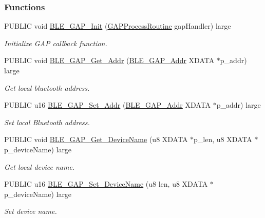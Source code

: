 \subsubsection*{Functions}
\begin{DoxyCompactItemize}
\item 
P\+U\+B\+L\+IC void \hyperlink{group___b_l_e___g_a_p_gac45863c4eb8ff1d4018f46a4bd6f8d90}{B\+L\+E\+\_\+\+G\+A\+P\+\_\+\+Init} (\hyperlink{group___b_l_e___g_a_p_ga239e1eed98ed57692459e70cad9d7021}{G\+A\+P\+Process\+Routine} gap\+Handler) large
\begin{DoxyCompactList}\small\item\em Initialize G\+AP callback function. \end{DoxyCompactList}\item 
P\+U\+B\+L\+IC void \hyperlink{group___b_l_e___g_a_p_ga9cee45941e9fbce9f1767c3de10658b7}{B\+L\+E\+\_\+\+G\+A\+P\+\_\+\+Get\+\_\+\+Addr} (\hyperlink{struct_b_l_e___g_a_p___addr}{B\+L\+E\+\_\+\+G\+A\+P\+\_\+\+Addr} X\+D\+A\+TA $\ast$p\+\_\+addr) large
\begin{DoxyCompactList}\small\item\em Get local bluetooth address. \end{DoxyCompactList}\item 
P\+U\+B\+L\+IC u16 \hyperlink{group___b_l_e___g_a_p_ga2c2ea40af263988eeb5d7ef561eae18f}{B\+L\+E\+\_\+\+G\+A\+P\+\_\+\+Set\+\_\+\+Addr} (\hyperlink{struct_b_l_e___g_a_p___addr}{B\+L\+E\+\_\+\+G\+A\+P\+\_\+\+Addr} X\+D\+A\+TA $\ast$p\+\_\+addr) large
\begin{DoxyCompactList}\small\item\em Set local Bluetooth address. \end{DoxyCompactList}\item 
P\+U\+B\+L\+IC void \hyperlink{group___b_l_e___g_a_p_gafb6fe23b989cd6248a5d305f1cb736f3}{B\+L\+E\+\_\+\+G\+A\+P\+\_\+\+Get\+\_\+\+Device\+Name} (u8 X\+D\+A\+TA $\ast$p\+\_\+len, u8 X\+D\+A\+TA $\ast$p\+\_\+device\+Name) large
\begin{DoxyCompactList}\small\item\em Get local device name. \end{DoxyCompactList}\item 
P\+U\+B\+L\+IC u16 \hyperlink{group___b_l_e___g_a_p_ga03b05b87f553204fcdb67a1ab157cc99}{B\+L\+E\+\_\+\+G\+A\+P\+\_\+\+Set\+\_\+\+Device\+Name} (u8 len, u8 X\+D\+A\+TA $\ast$p\+\_\+device\+Name) large
\begin{DoxyCompactList}\small\item\em Set device name. \end{DoxyCompactList}\item 

\end{DoxyCompactItemize}
